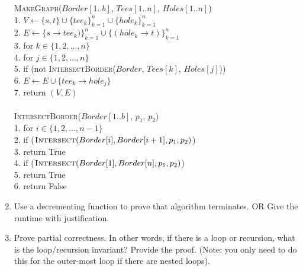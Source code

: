 \documentclass{article}
\begin{document}
\begin{enumerate}
\begin{algorithm}
        \textsc{MakeGraph}($Border[1..b]$, $Tees[1..n]$, $Holes[1..n]$) \\
        1. \hspace{1em} $V \gets \{ s, t \} \cup \{ tee_k \}_{k=1}^n \cup \{ hole_k \} _{k=1}^n$ \\
        2. \hspace{1em} $E \gets \{ s \to tee_k) \} _{k=1}^n \cup \{ (hole_k \to t) \} _{k=1}^n $ \\
        3. \hspace{1em} for $k \in \{ 1, 2, ..., n \} $ \\
        4. \hspace{2em}     for $j \in \{ 1, 2, ..., n \} $ \\
        5. \hspace{3em}         if (not \textsc{IntersectBorder}($Border$, $Tees[k]$, $Holes[j]$)) \\
        6. \hspace{4em}             $E \gets E \cup \{ tee_k \to hole_j \}$ \\
        7. \hspace{1em} return $(V, E)$ \\\\

        \textsc{IntersectBorder}($Border[1..b]$, $p_1$, $p_2$) \\
        1. \hspace{1em} for $i \in \{ 1, 2, ..., n-1 \}$ \\
        2. \hspace{2em}     if ($\textsc{Intersect}(Border[i], Border[i+1], p_1, p_2)$) \\
        3. \hspace{3em}         return True \\
        4. \hspace{1em} if ($\textsc{Intersect}(Border[1], Border[n], p_1, p_2)$) \\
        5. \hspace{2em}     return True \\
        6. \hspace{1em} return False
    \end{algorithm}
    \item Use a decrementing function to prove that algorithm terminates. OR  Give the runtime with justification.
    \item Prove partial correctness.
    In other words, if there is a loop or recursion, what is the loop/recursion invariant?
    Provide the proof.
    (Note: you only need to do this for the outer-most loop if there are nested loops).
\end{enumerate}
\end{document}
